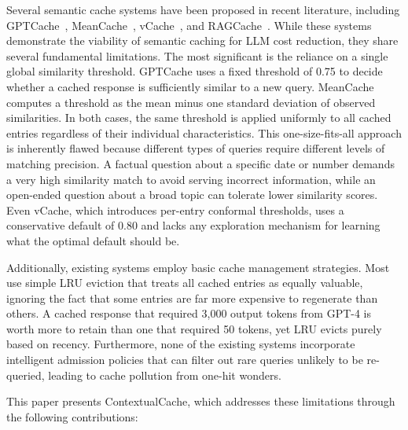 \documentclass[conference]{IEEEtran}
\begin{document}
Several semantic cache systems have been proposed in recent literature, including GPTCache~\cite{regmi2024}, MeanCache~\cite{gill2024}, vCache~\cite{schroeder2025}, and RAGCache~\cite{jin2024}. While these systems demonstrate the viability of semantic caching for LLM cost reduction, they share several fundamental limitations. The most significant is the reliance on a single global similarity threshold. GPTCache uses a fixed threshold of 0.75 to decide whether a cached response is sufficiently similar to a new query. MeanCache computes a threshold as the mean minus one standard deviation of observed similarities. In both cases, the same threshold is applied uniformly to all cached entries regardless of their individual characteristics. This one-size-fits-all approach is inherently flawed because different types of queries require different levels of matching precision. A factual question about a specific date or number demands a very high similarity match to avoid serving incorrect information, while an open-ended question about a broad topic can tolerate lower similarity scores. Even vCache, which introduces per-entry conformal thresholds, uses a conservative default of 0.80 and lacks any exploration mechanism for learning what the optimal default should be.

Additionally, existing systems employ basic cache management strategies. Most use simple LRU eviction that treats all cached entries as equally valuable, ignoring the fact that some entries are far more expensive to regenerate than others. A cached response that required 3,000 output tokens from GPT-4 is worth more to retain than one that required 50 tokens, yet LRU evicts purely based on recency. Furthermore, none of the existing systems incorporate intelligent admission policies that can filter out rare queries unlikely to be re-queried, leading to cache pollution from one-hit wonders.

This paper presents ContextualCache, which addresses these limitations through the following contributions:
\end{document}
